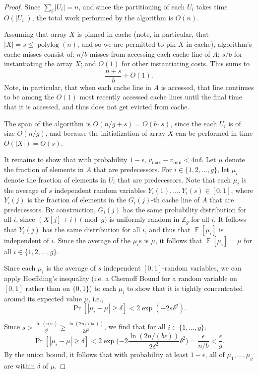 \documentclass[11pt]{article}
\newcommand{\polylog}{\operatorname{polylog}}
\def\E{\operatorname{\mathbb{E}}}
\theoremstyle{remark}
\theoremstyle{remark}
\begin{document}
\begin{proof}
Since $\sum_i |U_i| = n$, and since the partitioning of each $U_i$
takes time $O(|U_i|)$, the total work performed by the algorithm is
$O(n)$.

Assuming that array $X$ is pinned in cache (note, in particular, that
$|X| = s \le \polylog(n)$, and so we are permitted to pin $X$ in
cache), algorithm's cache misses consist of: $n/b$ misses from
accessing each cache line of $A$; $s/b$ for instantiating the array $X$;
and $O(1)$ for other instantiating costs. This sums
to $$\frac{n+s}{b}+O(1).$$
Note, in particular, that when each cache line in $A$ is accessed, that line continues to be among the $O(1)$ most recently accessed cache lines until the final time that it is accessed, and thus does not get evicted from cache.

The span of the algorithm is $O(n/g + s) = O(b\cdot s)$, since the
each $U_i$ is of size $O(n / g)$, and because the initialization of
array $X$ can be performed in time $O(|X|) = O(s)$.

It remains to show that with probability $1-\epsilon$, $v_{\text{max}}
- v_{\text{min}} < 4n\delta$. Let $\mu$ denote the fraction of
elements in $A$ that are predecessors. For $i \in \{1, 2, \ldots,
g\}$, let $\mu_i$ denote the fraction of elements in $U_i$ that are
predecessors. Note that each $\mu_i$ is the average of $s$ independent
random variables $Y_i(1), \ldots, Y_i(s) \in [0, 1]$, where $Y_i(j)$
is the fraction of elements in the $G_i(j)$-th cache line of $A$ that
are predecessors. By construction, $G_i(j)$ has the same probability
distribution for all $i$, since $(X[j] + i) \pmod g$ is uniformly
random in $\mathbb{Z}_g$ for all $i$. It follows that $Y_i(j)$ has the
same distribution for all $i$, and thus that $\E[\mu_i]$ is
independent of $i$. Since the average of the $\mu_i$s is $\mu$, it
follows that $\E[\mu_i] = \mu$ for all $i \in \{1, 2, \ldots, g\}$.

Since each $\mu_i$ is the average of $s$ independent $[0, 1]$-random
variables, we can apply Hoeffding's inequality (i.e. a Chernoff Bound
for a random variable on $[0,1]$ rather than on $\{0,1\}$) to each
$\mu_i$ to show that it is tightly concentrated around its expected
value $\mu$, i.e.,
$$\Pr[|\mu_i - \mu| \geq \delta] < 2\exp(-2s\delta^2). $$

Since $s > \frac{\ln (n/\epsilon)}{\delta^2} \ge \frac{\ln (2n / (b\epsilon))}{2\delta^2}$, we find that for all $i \in
\{1,\ldots, g\}$,
$$\Pr[|\mu_i - \mu| \geq \delta] < 2\exp\Big({-2} \frac{\ln
  (2n/(b\epsilon))}{2\delta^2} \delta^2\Big) = \frac{\epsilon}{n/b} <
\frac{\epsilon}{g}. $$ By the union bound, it follows that with
probability at least $1 - \epsilon$, all of $\mu_1, \ldots, \mu_{g}$ are within $\delta$ of $\mu$.


\end{proof}
\end{document}
